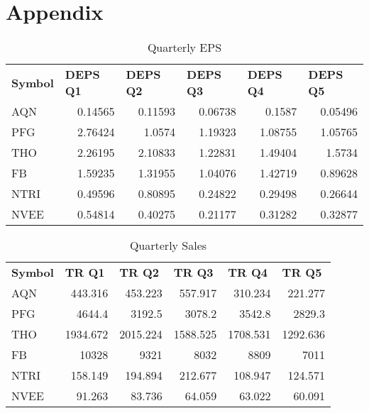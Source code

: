 \documentclass{article}
\begin{document}
\section{Appendix}
\begin{table}[htbp]
  \caption{Quarterly EPS}
   \begin{tabular}{lrrrrr}
    \textbf{Symbol} & \multicolumn{1}{l}{\textbf{DEPS Q1}} & \multicolumn{1}{l}{\textbf{DEPS Q2}} & \multicolumn{1}{l}{\textbf{DEPS Q3}} & \multicolumn{1}{l}{\textbf{DEPS Q4}} & \multicolumn{1}{l}{\textbf{DEPS Q5}} \\
    AQN   & 0.14565 & 0.11593 & 0.06738 & 0.1587 & 0.05496 \\
    PFG   & 2.76424 & 1.0574 & 1.19323 & 1.08755 & 1.05765 \\
    THO   & 2.26195 & 2.10833 & 1.22831 & 1.49404 & 1.5734 \\
    FB    & 1.59235 & 1.31955 & 1.04076 & 1.42719 & 0.89628 \\
    NTRI  & 0.49596 & 0.80895 & 0.24822 & 0.29498 & 0.26644 \\
    NVEE  & 0.54814 & 0.40275 & 0.21177 & 0.31282 & 0.32877 \\
    \end{tabular}%
  \label{tab:addlabel}%
\end{table}%

\begin{table}[htbp]
  \caption{Quarterly Sales}
    \begin{tabular}{lrrrrr}
    \textbf{Symbol} & \multicolumn{1}{l}{\textbf{TR Q1}} & \multicolumn{1}{l}{\textbf{TR Q2}} & \multicolumn{1}{l}{\textbf{TR Q3}} & \multicolumn{1}{l}{\textbf{TR Q4}} & \multicolumn{1}{l}{\textbf{TR Q5}} \\
    AQN   & 443.316 & 453.223 & 557.917 & 310.234 & 221.277 \\
    PFG   & 4644.4 & 3192.5 & 3078.2 & 3542.8 & 2829.3 \\
    THO   & 1934.672 & 2015.224 & 1588.525 & 1708.531 & 1292.636 \\
    FB    & 10328 & 9321  & 8032  & 8809  & 7011 \\
    NTRI  & 158.149 & 194.894 & 212.677 & 108.947 & 124.571 \\
    NVEE  & 91.263 & 83.736 & 64.059 & 63.022 & 60.091 \\
    \end{tabular}%
  \label{tab:addlabel}%
\end{table}%
\end{document}
